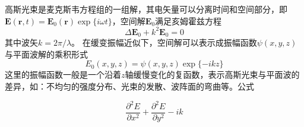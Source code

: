 

高斯光束是麦克斯韦方程组的一组解，其电矢量可以分离时间和空间部分，即$\boldsymbol E(\boldsymbol r,t)=\boldsymbol E_0(\boldsymbol r)\exp\{i\omega t\}$，空间解$\boldsymbol E_0$满足亥姆霍兹方程
\begin{equation}
\Delta \boldsymbol E_0 + k^2 \boldsymbol E_0=0
\end{equation}
其中波矢$k=2\pi/\lambda$。
在缓变振幅近似下，空间解可以表示成振幅函数$\psi(x,y,z)$与平面波解的乘积形式
\begin{equation}
E_0(x,y,z) = \psi(x,y,z)\exp\{-ikz\}
\end{equation}
这里的振幅函数一般是一个沿着$z$轴缓慢变化的复函数，表示高斯光束与平面波的差异，如：不均匀的强度分布、光束的发散、波阵面的弯曲等。公式



\begin{equation}\label{FMGB_eq1}
\frac{\partial^2 E}{\partial x^2} +\frac{\partial^2 E}{\partial y^2} -ik 
\end{equation}
